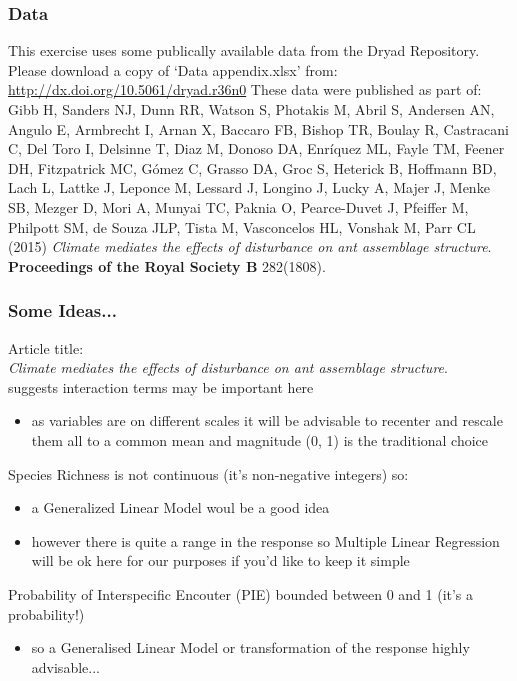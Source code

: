 \documentclass[xcolor=dvipsnames]{beamer}
\begin{document}
\begin{frame}
\frametitle{Data}

This exercise uses some publically available data from the Dryad Repository. Please download a copy of `Data appendix.xlsx' from:
\newline
\newline
\url{http://dx.doi.org/10.5061/dryad.r36n0}
\newline
\newline
These data were published as part of:
\newline
\newline
\small Gibb H, Sanders NJ, Dunn RR, Watson S, Photakis M, Abril S, Andersen AN, Angulo E, Armbrecht I, Arnan X, Baccaro FB, Bishop TR, Boulay R, Castracani C, Del Toro I, Delsinne T, Diaz M, Donoso DA, Enríquez ML, Fayle TM, Feener DH, Fitzpatrick MC, Gómez C, Grasso DA, Groc S, Heterick B, Hoffmann BD, Lach L, Lattke J, Leponce M, Lessard J, Longino J, Lucky A, Majer J, Menke SB, Mezger D, Mori A, Munyai TC, Paknia O, Pearce-Duvet J, Pfeiffer M, Philpott SM, de Souza JLP, Tista M, Vasconcelos HL, Vonshak M, Parr CL (2015) \textit{Climate mediates the effects of disturbance on ant assemblage structure}. \textbf{Proceedings of the Royal Society B} 282(1808).
\end{frame}

\begin{frame}
\frametitle{Some Ideas...}

Article title:\\
\textit{Climate mediates the effects of disturbance on ant assemblage structure}.\\
suggests interaction terms may be important here \begin{itemize}
 \item as variables are on different scales it will be advisable to recenter and rescale them all to a common mean and magnitude (0, 1) is the traditional choice
\newline
\end{itemize}
Species Richness is not continuous (it's non-negative integers) so: \begin{itemize}
\item a Generalized Linear Model woul be a good idea
\item however there is quite a range in the response so Multiple Linear Regression will be ok here for our purposes if you'd like to keep it simple
\newline
\end{itemize} 
Probability of Interspecific Encouter (PIE) bounded between 0 and 1 (it's a probability!) \begin{itemize}
\item so a Generalised Linear Model or transformation of the response highly advisable...\end{itemize}
\end{frame}
\end{document}
